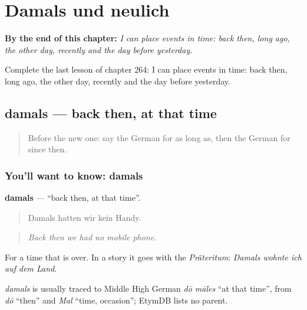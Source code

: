 
\chapter{Damals und neulich}
\label{ch:ge-damals-und-neulich}

\begin{chapteropening}
\textbf{By the end of this chapter:} \emph{I can place events in time: back then, long ago, the other day, recently and the day before yesterday.}

Complete the last lesson of chapter 264: I can place events in time: back then, long ago, the other day, recently and the day before yesterday.
\end{chapteropening}

\section[damals]{damals — back then, at that time}

\label{lesson:GE-C264-damals}



\begin{quote}
Before the new one: say the German for as long as, then the German for since then.
\end{quote}

\subsection*{You'll want to know: damals}
\textbf{damals} — \textquotedblleft{}back then, at that time\textquotedblright{}.

\begin{quote}
Damals hatten wir kein Handy.
\end{quote}

\begin{quote}
\emph{Back then we had no mobile phone.}
\end{quote}

For a time that is over. In a story it goes with the \emph{Präteritum}: \emph{Damals wohnte ich auf dem Land}.

\begin{cousinweb}
\emph{damals} is usually traced to Middle High German \emph{dō māles} \textquotedblleft{}at that time\textquotedblright{}, from \emph{dō} \textquotedblleft{}then\textquotedblright{} and \emph{Mal} \textquotedblleft{}time, occasion\textquotedblright{}; EtymDB lists no parent.
\end{cousinweb}

